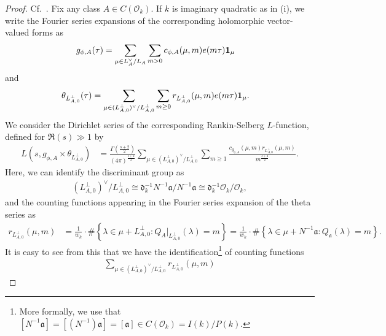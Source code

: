 \documentclass{amsart}
\theoremstyle{definition}
\theoremstyle{definition}
\theoremstyle{definition}
\begin{document}
\begin{proof} Cf.~\cite[Corollary 4.18]{VO}. Fix any class $A \in C(\mathcal{O}_k)$. 
If $k$ is imaginary quadratic as in (i), we write the Fourier series expansions of the corresponding holomorphic vector-valued forms as 
\begin{align*} g_{\phi, A}(\tau) 
&= \sum\limits_{ \mu \in L_A^{\vee}/L_A } \sum\limits_{m >0} c_{\phi, A}(\mu, m) e(m \tau) {\bf{1}}_{\mu}  \end{align*}
and
\begin{align*} \theta_{L_{A,0}^{\perp}}(\tau)  
&= \sum\limits_{  \mu \in (L_{A,0}^{\perp})^{\vee} / L_{A, 0}^{\perp} } \sum\limits_{m \geq 0} r_{L_{A, 0}^{\perp}}(\mu, m) e(m \tau) {\bf{1}}_{\mu}. \end{align*}
We consider the Dirichlet series of the corresponding Rankin-Selberg $L$-function, defined for $\Re(s) \gg 1$ by 
\begin{equation*}\begin{aligned}
L(s, g_{\phi, A} \times \theta_{L_{A,0}^{\perp}}) 
&= \frac{ \Gamma \left( \frac{s+2}{2} \right)  }{ (4 \pi)^{ \frac{s+2}{2}  } }
\sum\limits_{ \mu \in (L_{A,0}^{\perp})^{\vee} / L_{A,0}^{\perp} } \sum\limits_{m \geq 1} 
\frac{  c_{g_{\phi, A}}(\mu, m) r_{ L_{A,0}^{\perp} }(\mu, m) }{ m^{\frac{s+2}{2} } }. \end{aligned}\end{equation*}
Here, we can identify the discriminant group as 
\begin{align*} (L_{A,0}^{\perp})^{\vee} / L_{A,0}^{\perp} \cong \mathfrak{d}_k^{-1} N^{-1} \mathfrak{a} / N^{-1} \mathfrak{a} 
\cong \mathfrak{d}_k^{-1} \mathcal{O}_k / \mathcal{O}_k, \end{align*}
and the counting functions appearing in the Fourier series expansion of the theta series as
\begin{align*} r_{L_{A,0}^{\perp}}(\mu, m) 
&= \frac{1}{w_k} \cdot \# \left\lbrace \lambda \in \mu + L_{A,0}^{\perp}  : Q_A\vert_{L_{A,0}^{\perp} }(\lambda) = m \right\rbrace
=\frac{1}{w_k} \cdot \# \left\lbrace \lambda \in \mu + N^{-1} \mathfrak{a}: Q_{\mathfrak{a}}(\lambda) = m \right\rbrace. \end{align*}
It is easy to see from this that we have the identification\footnote{More formally, we use that 
$[N^{-1} \mathfrak{a}] = [(N^{-1}) \mathfrak{a}] = [\mathfrak{a}] \in C(\mathcal{O}_k) = I(k)/P(k)$.} of counting functions 
\begin{align*} \sum\limits_{ \mu \in (L_{A,0}^{\perp})^{\vee} / L_{A,0}^{\perp} } r_{L_{A,0}^{\perp}}(\mu, m)

\end{align*}
\end{proof}
\end{document}
